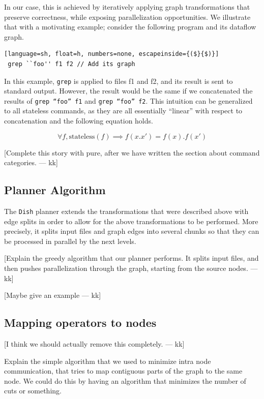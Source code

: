 \documentclass[sigplan,10pt,review,anonymous]{acmart}
\newcommand{\kk}[1]{[{\color{magenta}#1 --- kk}]}
\begin{document}
In our case, this is achieved by iteratively applying graph
transformations that preserve correctness, while exposing
parallelization opportunities. We illustrate that with a motivating
example; consider the following program and its dataflow graph.

\begin{lstlisting}[language=sh, float=h, numbers=none, escapeinside={($}{$)}]
 grep ``foo'' f1 f2 // Add its graph
\end{lstlisting}

\noindent
In this example, \texttt{grep} is applied to files f1 and f2, and its
result is sent to standard output. However, the result would be the
same if we concatenated the results of \texttt{grep ``foo'' f1} and
\texttt{grep ``foo'' f2}. This intuition can be generalized to all
stateless commands, as they are all essentially ``linear'' with
respect to concatenation and the following equation holds.

\[
\forall f, \mathrm{stateless}(f) \implies f(x.x') = f(x).f(x')
\]

\kk{Complete this story with pure, after we have written the section
  about command categories.}

\subsection{Planner Algorithm}

The \texttt{Dish} planner extends the transformations that were
described above with edge splits in order to allow for the above
transformations to be performed. More precisely, it splits input files
and graph edges into several chunks so that they can be processed in
parallel by the next levels.

\kk{Explain the greedy algorithm that our planner performs. It splits
  input files, and then pushes parallelization through the graph,
  starting from the source nodes.}

\kk{Maybe give an example}



\subsection{Mapping operators to nodes}

\kk{I think we should actually remove this completely.}

Explain the simple algorithm that we used to minimize intra node
communication, that tries to map contiguous parts of the graph to the
same node. We could do this by having an algorithm that minimizes the
number of cuts or something.
\end{document}
